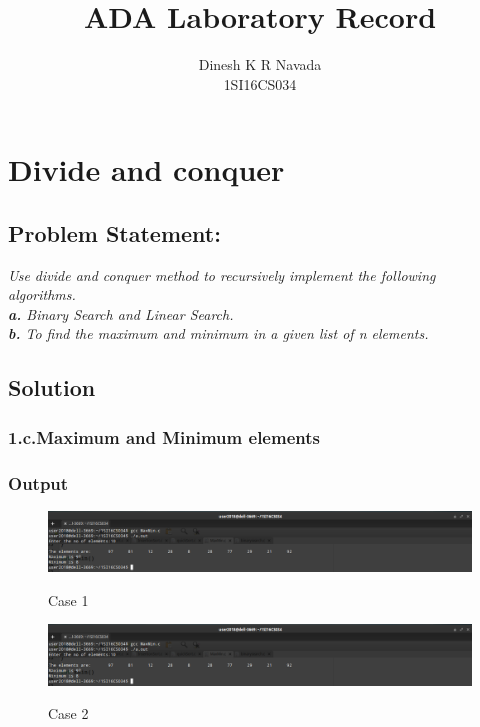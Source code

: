 \documentclass[12pt, a4paper]{article}
\title{\vspace*{2 in}ADA Laboratory Record}
\author{Dinesh K R Navada\\1SI16CS034}
\date{}
\begin{document}
\maketitle
\newpage
{}
\lstset{numbers=left, numberstyle=\tiny, stepnumber=1, numbersep=5 pt}
\section{Divide and conquer}\subsection*{Problem Statement:}\par\textit{Use divide and conquer method to recursively implement the following \\algorithms.\\\textbf{a.}
 Binary Search and Linear Search.\\
\textbf{b.} To find the maximum and minimum in a given list of n elements.}
\subsection*{Solution}
\subsubsection*{1.c.Maximum and Minimum elements}

\newpage
\subsubsection*{Output}
\begin{figure}[h]
\centering
\includegraphics[width=5 in,height=1.3 in]{./Output/im1.png}
\label{Figure 2}
\caption{Case 1}
\end{figure}
\begin{figure}[h]
\centering
\includegraphics[width=5 in,height=1.3 in]{./Output/im2.png}
\label{Figure 3}
\caption{Case 2}
\end{figure}
\newpage
\end{document}

